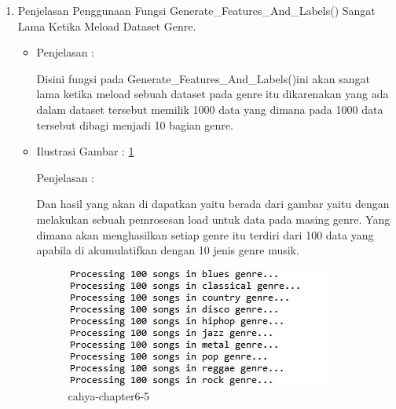 \begin{enumerate}
\begin{itemize}
\end{itemize}
\par
\par
\par
\par
\par
\par
\par
\par
\item Penjelasan Penggunaan Fungsi Generate\_Features\_And\_Labels() Sangat Lama Ketika Meload Dataset Genre.
\begin{itemize}
\par
\item Penjelasan : 
\par Disini fungsi pada Generate\_Features\_And\_Labels()ini akan sangat lama ketika meload sebuah dataset pada genre itu dikarenakan yang ada dalam dataset tersebut memilik 1000 data yang dimana pada 1000 data tersebut dibagi menjadi 10 bagian genre. 
\par
\item Ilustrasi Gambar : \ref{cahya-chapter6-5}
\par Penjelasan :
\par Dan hasil yang akan di dapatkan yaitu berada dari gambar yaitu dengan melakukan sebuah pemrosesan load untuk data pada masing genre. Yang dimana akan menghasilkan setiap genre itu terdiri dari 100 data yang apabila di akumulatifkan dengan 10 jenis genre musik.
\begin{figure}[!hbtp]
\centering
\includegraphics[scale=0.2]{figures/cahya-chapter6-5.jpg}
\caption{cahya-chapter6-5}
\label{cahya-chapter6-5}
\end{figure}
\par
\end{itemize}
\end{enumerate}
\par
\par
\par

